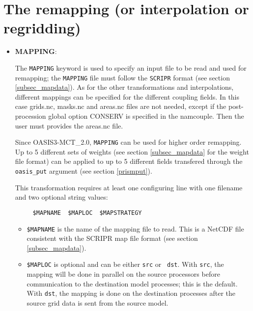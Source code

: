 
\section{The remapping (or interpolation or regridding)}
\label{subsec_interp}

\begin{itemize}

\item {\bf MAPPING}:

  The {\tt MAPPING} keyword is used to specify an input file to be
  read and used for remapping;  the
  {\tt MAPPING} file must follow the {\tt SCRIPR} format (see
    section \ref{subsec_mapdata}). As for the other transformations
    and interpolations, different mappings can be specified for the
    different coupling fields.
  In this case grids.nc, masks.nc and areas.nc
  files are not needed, except if the post-procession global option
  CONSERV is specified in the namcouple. Then the user must provides the
  areas.nc file.
 
  Since OASIS3-MCT\_2.0, {\tt MAPPING} can be used for higher order
  remapping. Up to 5 different sets of weights (see section
  \ref{subsec_mapdata} for the weight file format) can be applied to
  up to 5 different fields transfered through the {\tt oasis\_put} argument
  (see section \ref{prismput}).

  This transformation requires at least one configuring line with one
  filename and two optional string values:
\begin{verbatim}
     $MAPNAME  $MAPLOC  $MAPSTRATEGY
\end{verbatim}
  \begin{itemize}
  \item {\tt \$MAPNAME} is the name of the mapping file to read.  This
    is a NetCDF file consistent with the SCRIPR map file format (see
    section \ref{subsec_mapdata}).

  \item {\tt \$MAPLOC} is optional and can be either {\tt src} or {\tt
      dst}.  With {\tt src}, the mapping will be done in parallel on
    the source processors before communication to the destination
    model processes; this is the default.  With {\tt dst}, the mapping
    is done on the destination processes after the source grid data is
    sent from the source model.


\end{itemize}
\end{itemize}
